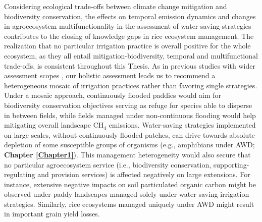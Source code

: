 Considering ecological trade-offs between climate change mitigation and biodiversity conservation, the effects on temporal emission dynamics and changes in agroecosystem multifunctionality in the assessment of water-saving strategies contributes to the closing of knowledge gaps in rice ecosystem management. The realization that no particular irrigation practice is overall positive for the whole ecosystem, as they all entail mitigation-biodiversity, temporal and multifunctional trade-offs, is consistent throughout this Thesis. As in previous studies with wider assessment scopes \citep{watanabe2013}, %
our holistic assessment leads us to recommend a heterogeneous mosaic of irrigation practices rather than favoring single strategies. Under a mosaic approach, continuously flooded paddies would aim for biodiversity conservation objectives serving as refuge for species able to disperse in between fields, while fields managed under non-continuous flooding would help mitigating overall landscape CH$_{4}$ emissions. Water-saving strategies implemented on large scales, without continuously flooded patches, can drive towards absolute depletion of some susceptible groups of organisms (e.g., amphibians under AWD; \textbf{Chapter \ref{Chapter1}}). This management heterogeneity would also secure that no particular agroecosystem service (i.e., biodiversity conservation, supporting-regulating and provision services) is affected negatively on large extensions. For instance, extensive negative impacts on soil particulated organic carbon might be observed under paddy landscapes managed solely under water-saving irrigation strategies. Similarly, rice ecosystems managed uniquely under AWD might result in important grain yield losses.\\ 

